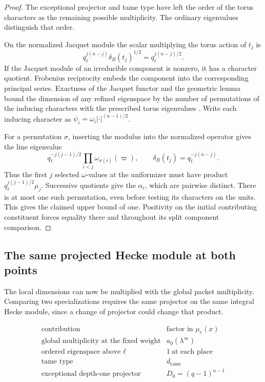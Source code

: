 \begin{proof}
The exceptional projector and tame type have left the order of the torus characters as the remaining possible multiplicity. The ordinary eigenvalues distinguish that order.

On the normalized Jacquet module the scalar multiplying the torus action of \(t_j\) is
\[
 q_\ell^{j(n-j)}\delta_B(t_j)^{1/2}=q_\ell^{j(n-j)/2}.
\]
If the Jacquet module of an irreducible
component is nonzero, it has a character
quotient. Frobenius reciprocity embeds the
component into the corresponding principal
series. Exactness of the Jacquet functor and
the geometric lemma bound the dimension of
any refined eigenspace by the number of
permutations of the inducing characters with
the prescribed torus eigenvalues
\cite[\S2.12]{bernstein-zelevinsky}.
Write each inducing character as
\(\psi_i=\omega_i|\cdot|^{(n-1)/2}\).

For a permutation \(\sigma\), inserting the modulus into the normalized operator gives the line eigenvalue
\[
 q_\ell^{-j(j-1)/2}\prod_{i<j}\omega_{\sigma(i)}(\varpi),\qquad \delta_B(t_j)=q_\ell^{-j(n-j)} .
\]
Thus the first \(j\) selected \(\omega\)-values
at the uniformizer must have product
\(q_\ell^{j(j-1)/2}\mu_j\). Successive quotients
give the \(\alpha_i\), which are pairwise
distinct. There is at most one such
permutation, even before testing its
characters on the units. This gives the
claimed upper bound of one. Positivity on
the initial contributing constituent
forces equality there and throughout its
split component comparison.

\end{proof}

\subsection{The same projected Hecke module at both points}

The local dimensions can now be multiplied with the global packet multiplicity. Comparing two specializations requires the same projector on the same integral Hecke module, since a change of projector could change that product.

\begin{construction}
\[
\begin{array}{lr}
\text{contribution}&\text{factor in }\mu_e(x)\\ \hline
\text{global multiplicity at the fixed weight}&a_0(\lambda^\infty)\\
\text{ordered eigenspace above }\ell&1\ \text{at each place}\\
\text{tame type}&d_{\mathrm{tame}}\\
\text{exceptional depth-one projector}&D_0=(q-1)^{n-1}
\end{array}
\]
\caption{Factors of the projected multiplicity at an irreducible arithmetic point. At fixed weight and local data each contributes the same factor at both points being compared.}\label{fig:ordinary-multiplicity-factors}
\end{construction}


